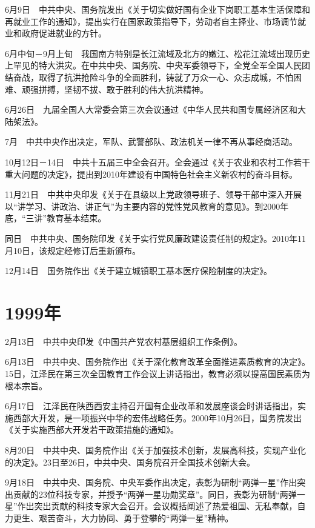\documentclass[10pt,a4paper,twocolumn]{book}
\begin{document}
6月9日　中共中央、国务院发出《关于切实做好国有企业下岗职工基本生活保障和再就业工作的通知》，提出实行在国家政策指导下，劳动者自主择业、市场调节就业和政府促进就业的方针。

6月中旬－9月上旬　我国南方特别是长江流域及北方的嫩江、松花江流域出现历史上罕见的特大洪灾。在中共中央、国务院、中央军委领导下，全党全军全国人民团结奋战，取得了抗洪抢险斗争的全面胜利，铸就了万众一心、众志成城，不怕困难、顽强拼搏，坚韧不拔、敢于胜利的伟大抗洪精神。

6月26日　九届全国人大常委会第三次会议通过《中华人民共和国专属经济区和大陆架法》。

7月　中共中央作出决定，军队、武警部队、政法机关一律不再从事经商活动。

10月12日－14日　中共十五届三中全会召开。全会通过《关于农业和农村工作若干重大问题的决定》，提出到2010年建设有中国特色社会主义新农村的奋斗目标。

11月21日　中共中央印发《关于在县级以上党政领导班子、领导干部中深入开展以“讲学习、讲政治、讲正气”为主要内容的党性党风教育的意见》。到2000年底，“三讲”教育基本结束。

同日　中共中央、国务院印发《关于实行党风廉政建设责任制的规定》。2010年11月10日，该规定经修订后重新颁布。

12月14日　国务院作出《关于建立城镇职工基本医疗保险制度的决定》。

\section{1999年}

2月13日　中共中央印发《中国共产党农村基层组织工作条例》。

6月13日　中共中央、国务院作出《关于深化教育改革全面推进素质教育的决定》。15日，江泽民在第三次全国教育工作会议上讲话指出，教育必须以提高国民素质为根本宗旨。

6月17日　江泽民在陕西西安主持召开国有企业改革和发展座谈会时讲话指出，实施西部大开发，是一项振兴中华的宏伟战略任务。2000年10月26日，国务院发出《关于实施西部大开发若干政策措施的通知》。

8月20日　中共中央、国务院作出《关于加强技术创新，发展高科技，实现产业化的决定》。23日至26日，中共中央、国务院召开全国技术创新大会。

9月18日　中共中央、国务院、中央军委作出决定，表彰为研制“两弹一星”作出突出贡献的23位科技专家，并授予“两弹一星功勋奖章”。同日，表彰为研制“两弹一星”作出突出贡献的科技专家大会召开。会议概括阐述了热爱祖国、无私奉献，自力更生、艰苦奋斗，大力协同、勇于登攀的“两弹一星”精神。
\end{document}
